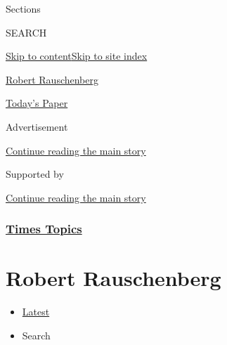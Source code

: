 Sections

SEARCH

\protect\hyperlink{site-content}{Skip to
content}\protect\hyperlink{site-index}{Skip to site index}

\href{https://www.nytimes.com/topic/person/robert-rauschenberg}{Robert
Rauschenberg}

\href{https://myaccount.nytimes.com/auth/login?response_type=cookie\&client_id=vi}{}

\href{https://www.nytimes.com/section/todayspaper}{Today's Paper}

Advertisement

\protect\hyperlink{after-top}{Continue reading the main story}

Supported by

\protect\hyperlink{after-sponsor}{Continue reading the main story}

\hypertarget{times-topics}{%
\subsubsection{\texorpdfstring{\href{/index.html}{Times
Topics}}{Times Topics}}\label{times-topics}}

\hypertarget{robert-rauschenberg}{%
\section{Robert Rauschenberg}\label{robert-rauschenberg}}

\begin{itemize}
\tightlist
\item
  \protect\hyperlink{stream-panel}{Latest}
\item
  Search
\end{itemize}

